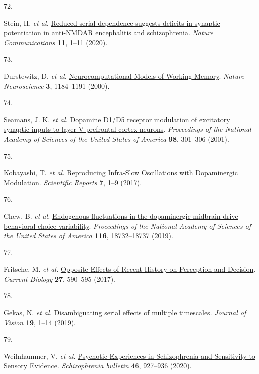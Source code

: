\documentclass[
]{article}
\newlength{\cslhangindent}
\newlength{\csllabelwidth}
\newlength{\cslentryspacingunit} %
\newenvironment{CSLReferences}[2] %
 {%
  \setlength{\parindent}{0pt}
  \ifodd #1
  \let\oldpar\par
  \def\par{\hangindent=\cslhangindent\oldpar}
  \fi
  \setlength{\parskip}{#2\cslentryspacingunit}
 }%
 {}
\newcommand{\CSLLeftMargin}[1]{\parbox[t]{\csllabelwidth}{#1}}
\newcommand{\CSLRightInline}[1]{\parbox[t]{\linewidth - \csllabelwidth}{#1}\break}
\begin{document}
\begin{CSLReferences}{0}{0}
\leavevmode{}%
\CSLLeftMargin{72. }%
\CSLRightInline{Stein, H. \emph{et al.}
\href{https://doi.org/10.1038/s41467-020-18033-3}{{Reduced serial
dependence suggests deficits in synaptic potentiation in anti-NMDAR
encephalitis and schizophrenia}}. \emph{Nature Communications}
\textbf{11}, 1--11 (2020).}

\leavevmode{}%
\CSLLeftMargin{73. }%
\CSLRightInline{Durstewitz, D. \emph{et al.}
\href{https://doi.org/10.1038/81460}{{Neurocomputational Models of
Working Memory}}. \emph{Nature Neuroscience} \textbf{3}, 1184--1191
(2000).}

\leavevmode{}%
\CSLLeftMargin{74. }%
\CSLRightInline{Seamans, J. K. \emph{et al.}
\href{https://doi.org/10.1073/pnas.98.1.301}{{Dopamine D1/D5 receptor
modulation of excitatory synaptic inputs to layer V prefrontal cortex
neurons}}. \emph{Proceedings of the National Academy of Sciences of the
United States of America} \textbf{98}, 301--306 (2001).}

\leavevmode{}%
\CSLLeftMargin{75. }%
\CSLRightInline{Kobayashi, T. \emph{et al.}
\href{https://doi.org/10.1038/s41598-017-02366-z}{{Reproducing
Infra-Slow Oscillations with Dopaminergic Modulation}}. \emph{Scientific
Reports} \textbf{7}, 1--9 (2017).}

\leavevmode{}%
\CSLLeftMargin{76. }%
\CSLRightInline{Chew, B. \emph{et al.}
\href{https://doi.org/10.1073/pnas.1900872116}{{Endogenous fluctuations
in the dopaminergic midbrain drive behavioral choice variability}}.
\emph{Proceedings of the National Academy of Sciences of the United
States of America} \textbf{116}, 18732--18737 (2019).}

\leavevmode{}%
\CSLLeftMargin{77. }%
\CSLRightInline{Fritsche, M. \emph{et al.}
\href{https://doi.org/10.1016/j.cub.2017.01.006}{{Opposite Effects of
Recent History on Perception and Decision}}. \emph{Current Biology}
\textbf{27}, 590--595 (2017).}

\leavevmode{}%
\CSLLeftMargin{78. }%
\CSLRightInline{Gekas, N. \emph{et al.}
\href{https://doi.org/10.1167/19.6.24}{{Disambiguating serial effects of
multiple timescales}}. \emph{Journal of Vision} \textbf{19}, 1--14
(2019).}

\leavevmode{}%
\CSLLeftMargin{79. }%
\CSLRightInline{Weilnhammer, V. \emph{et al.}
\href{https://www.ncbi.nlm.nih.gov/pubmed/32090246}{{Psychotic
Experiences in Schizophrenia and Sensitivity to Sensory Evidence.}}
\emph{Schizophrenia bulletin} \textbf{46}, 927--936 (2020).}


\end{CSLReferences}
\end{document}

